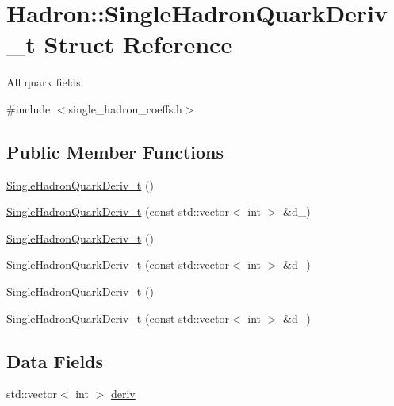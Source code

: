 \hypertarget{structHadron_1_1SingleHadronQuarkDeriv__t}{}\section{Hadron\+:\+:Single\+Hadron\+Quark\+Deriv\+\_\+t Struct Reference}
\label{structHadron_1_1SingleHadronQuarkDeriv__t}


All quark fields.  




{\ttfamily \#include $<$single\+\_\+hadron\+\_\+coeffs.\+h$>$}

\subsection*{Public Member Functions}
\begin{DoxyCompactItemize}
\item 
\mbox{\hyperlink{structHadron_1_1SingleHadronQuarkDeriv__t_ada7d1ddc236b6bdac2c9c737247490e4}{Single\+Hadron\+Quark\+Deriv\+\_\+t}} ()
\item 
\mbox{\hyperlink{structHadron_1_1SingleHadronQuarkDeriv__t_aa7239c485a6348276814f945fe15139c}{Single\+Hadron\+Quark\+Deriv\+\_\+t}} (const std\+::vector$<$ int $>$ \&d\+\_\+)
\item 
\mbox{\hyperlink{structHadron_1_1SingleHadronQuarkDeriv__t_ada7d1ddc236b6bdac2c9c737247490e4}{Single\+Hadron\+Quark\+Deriv\+\_\+t}} ()
\item 
\mbox{\hyperlink{structHadron_1_1SingleHadronQuarkDeriv__t_aa7239c485a6348276814f945fe15139c}{Single\+Hadron\+Quark\+Deriv\+\_\+t}} (const std\+::vector$<$ int $>$ \&d\+\_\+)
\item 
\mbox{\hyperlink{structHadron_1_1SingleHadronQuarkDeriv__t_ada7d1ddc236b6bdac2c9c737247490e4}{Single\+Hadron\+Quark\+Deriv\+\_\+t}} ()
\item 
\mbox{\hyperlink{structHadron_1_1SingleHadronQuarkDeriv__t_aa7239c485a6348276814f945fe15139c}{Single\+Hadron\+Quark\+Deriv\+\_\+t}} (const std\+::vector$<$ int $>$ \&d\+\_\+)
\end{DoxyCompactItemize}
\subsection*{Data Fields}
\begin{DoxyCompactItemize}
\item 
std\+::vector$<$ int $>$ \mbox{\hyperlink{structHadron_1_1SingleHadronQuarkDeriv__t_a20101dafcfaf3f8294f11c87ec3445c6}{deriv}}
\end{DoxyCompactItemize}


